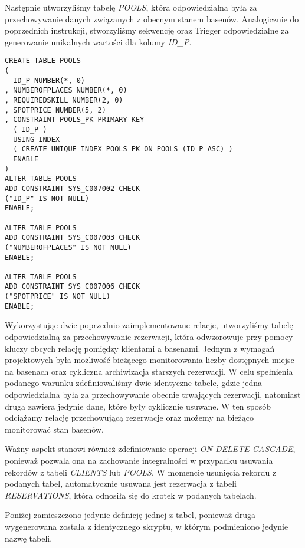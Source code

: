 \documentclass[a4paper]{article}
\begin{document}
Następnie utworzyliśmy tabelę \textit{POOLS}, która odpowiedzialna była za przechowywanie danych związanych z obecnym stanem basenów. Analogicznie do poprzednich instrukcji, stworzyliśmy sekwencję oraz Trigger odpowiedzialne za generowanie unikalnych wartości dla kolumy \textit{ID\_P}.

\begin{verbatim}
CREATE TABLE POOLS 
(
  ID_P NUMBER(*, 0) 
, NUMBEROFPLACES NUMBER(*, 0) 
, REQUIREDSKILL NUMBER(2, 0) 
, SPOTPRICE NUMBER(5, 2) 
, CONSTRAINT POOLS_PK PRIMARY KEY 
  ( ID_P )
  USING INDEX 
  ( CREATE UNIQUE INDEX POOLS_PK ON POOLS (ID_P ASC) )
  ENABLE 
) 
ALTER TABLE POOLS
ADD CONSTRAINT SYS_C007002 CHECK 
("ID_P" IS NOT NULL)
ENABLE;

ALTER TABLE POOLS
ADD CONSTRAINT SYS_C007003 CHECK 
("NUMBEROFPLACES" IS NOT NULL)
ENABLE;

ALTER TABLE POOLS
ADD CONSTRAINT SYS_C007006 CHECK 
("SPOTPRICE" IS NOT NULL)
ENABLE;

\end{verbatim}

Wykorzystując dwie poprzednio zaimplementowane relacje, utworzyliśmy tabelę odpowiedzialną za przechowywanie rezerwacji, która odwzorowuje przy pomocy kluczy obcych relację pomiędzy klientami a basenami.
Jednym z wymagań projektowych była możliwość bieżącego monitorowania liczby dostępnych miejsc na basenach oraz cykliczna archiwizacja starszych rezerwacji. W celu spełnienia podanego warunku zdefiniowaliśmy dwie identyczne tabele, gdzie jedna odpowiedzialna była za przechowywanie obecnie trwających rezerwacji, natomiast druga zawiera jedynie dane, które były cyklicznie usuwane. W ten sposób odciążamy relację przechowującą rezerwacje oraz możemy na bieżąco monitorować stan basenów.

Ważny aspekt stanowi również zdefiniowanie operacji \textit{ON DELETE CASCADE}, ponieważ pozwala ona na zachowanie integralności w przypadku usuwania rekordów z tabeli \textit{CLIENTS} lub \textit{POOLS}. W momencie usunięcia rekordu z podanych tabel, automatycznie usuwana jest rezerwacja z tabeli \textit{RESERVATIONS}, która odnosiła się do krotek w podanych tabelach.

Poniżej zamieszczono jedynie definicję jednej z tabel, ponieważ druga wygenerowana została z identycznego skryptu, w którym podmieniono jedynie nazwę tabeli.

\newpage
\end{document}
